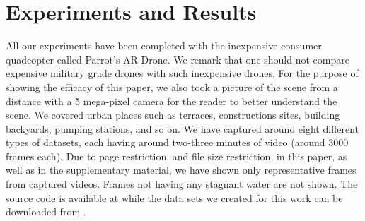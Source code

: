 



\section{Experiments and Results}

All our experiments have been completed with the inexpensive consumer
quadcopter called Parrot's AR Drone. We remark that one should not
compare expensive military grade drones with such inexpensive drones.
For the purpose of showing the efficacy of this paper, we also took a
picture of the scene from a distance with a 5 mega-pixel camera for
the reader to better understand the scene.  We covered urban places
such as terraces, constructions sites, building backyards,
pumping stations, and so on.  We have captured around eight different
types of datasets, each having around two-three minutes of video
(around 3000 frames each). Due to page restriction, and file size
restriction, in this paper, as well as in the
supplementary material, we have shown only representative frames from
captured videos. Frames not having any stagnant water are not shown. 
The source code is available at \cite{code} while the data sets we
created for this work can be downloaded from \cite{datasets}.

